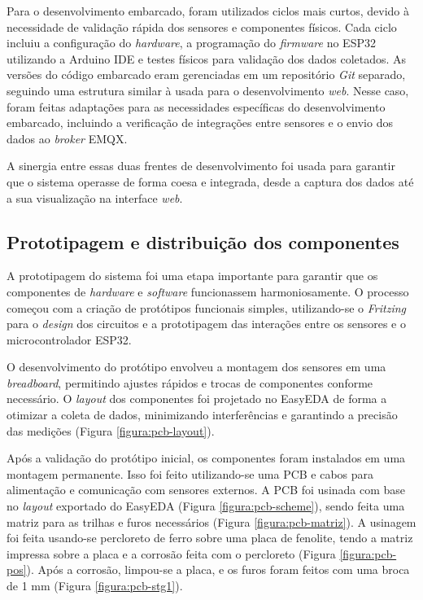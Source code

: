 Para o desenvolvimento embarcado, foram utilizados ciclos mais curtos, devido à necessidade de validação rápida dos sensores e componentes físicos. Cada ciclo incluiu a configuração do \textit{hardware}, a programação do \textit{firmware} no ESP32 utilizando a Arduino IDE e testes físicos para validação dos dados coletados. As versões do código embarcado eram gerenciadas em um repositório \textit{Git} separado, seguindo uma estrutura similar à usada para o desenvolvimento \textit{web}. Nesse caso, foram feitas adaptações para as necessidades específicas do desenvolvimento embarcado, incluindo a verificação de integrações entre sensores e o envio dos dados ao \textit{broker} EMQX.

A sinergia entre essas duas frentes de desenvolvimento foi usada para garantir que o sistema operasse de forma coesa e integrada, desde a captura dos dados até a sua visualização na interface \textit{web}.

\subsection{Prototipagem e distribuição dos componentes}

A prototipagem do sistema foi uma etapa importante para garantir que os componentes de \textit{hardware} e \textit{software} funcionassem harmoniosamente. O processo começou com a criação de protótipos funcionais simples, utilizando-se o \textit{Fritzing} para o \textit{design} dos circuitos e a prototipagem das interações entre os sensores e o microcontrolador ESP32.

O desenvolvimento do protótipo envolveu a montagem dos sensores em uma \textit{breadboard}, permitindo ajustes rápidos e trocas de componentes conforme necessário. O \textit{layout} dos componentes foi projetado no EasyEDA de forma a otimizar a coleta de dados, minimizando interferências e garantindo a precisão das medições (Figura \ref{figura:pcb-layout}). 

Após a validação do protótipo inicial, os componentes foram instalados em uma montagem permanente. Isso foi feito utilizando-se uma PCB e cabos para alimentação e comunicação com sensores externos. A PCB foi usinada com base no \textit{layout} exportado do EasyEDA (Figura \ref{figura:pcb-scheme}), sendo feita uma matriz para as trilhas e furos necessários (Figura \ref{figura:pcb-matriz}). A usinagem foi feita usando-se percloreto de ferro sobre uma placa de fenolite, tendo a matriz impressa sobre a placa e a corrosão feita com o percloreto (Figura \ref{figura:pcb-pos}). Após a corrosão, limpou-se a placa, e os furos foram feitos com uma broca de 1 mm (Figura \ref{figura:pcb-stg1}).


